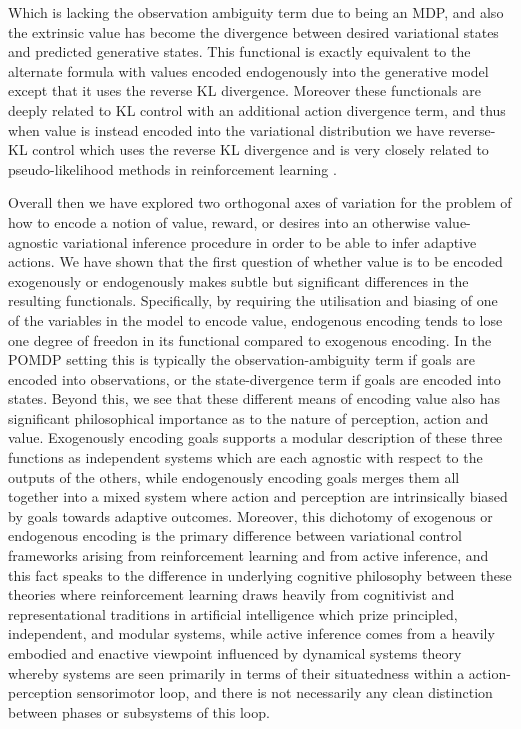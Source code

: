 Which is lacking the observation ambiguity term due to being an MDP, and also the extrinsic value has become the divergence between desired variational states and predicted generative states. This functional is exactly equivalent to the alternate formula with values encoded endogenously into the generative model except that it uses the reverse KL divergence. Moreover these functionals are deeply related to KL control with an additional action divergence term, and thus when value is instead encoded into the variational distribution we have reverse-KL control which uses the reverse KL divergence and is very closely related to pseudo-likelihood methods in reinforcement learning \citep{abdolmaleki2018maximum,peters2007reinforcement}.

Overall then we have explored two orthogonal axes of variation for the problem of how to encode a notion of value, reward, or desires into an otherwise value-agnostic variational inference procedure in order to be able to infer adaptive actions. We have shown that the first question of whether value is to be encoded exogenously or endogenously makes subtle but significant differences in the resulting functionals. Specifically, by requiring the utilisation and biasing of one of the variables in the model to encode value, endogenous encoding tends to lose one degree of freedon in its functional compared to exogenous encoding. In the POMDP setting this is typically the observation-ambiguity term if goals are encoded into observations, or the state-divergence term if goals are encoded into states. Beyond this, we see that these different means of encoding value also has significant philosophical importance as to the nature of perception, action and value. Exogenously encoding goals supports a modular description of these three functions as independent systems which are each agnostic with respect to the outputs of the others, while endogenously encoding goals merges them all together into a mixed system where action and perception are intrinsically biased by goals towards adaptive outcomes. Moreover, this dichotomy of exogenous or endogenous encoding is the primary difference between variational control frameworks arising from reinforcement learning and from active inference, and this fact speaks to the difference in underlying cognitive philosophy between these theories where reinforcement learning draws heavily from cognitivist and representational traditions in artificial intelligence which prize principled, independent, and modular systems, while active inference comes from a heavily embodied and enactive viewpoint influenced by dynamical systems theory whereby systems are seen primarily in terms of their situatedness within a action-perception sensorimotor loop, and there is not necessarily any clean distinction between phases or subsystems of this loop.

